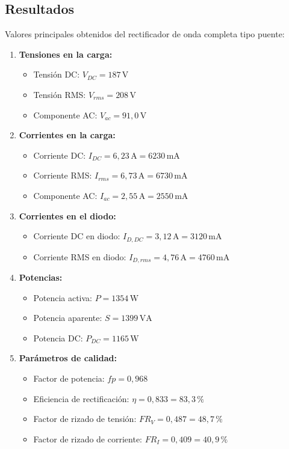 \documentclass[12pt,a4paper]{article}
\begin{document}
\subsection{Resultados}

Valores principales obtenidos del rectificador de onda completa tipo puente:

\begin{enumerate}
    \item \textbf{Tensiones en la carga:}
    \begin{itemize}
        \item Tensión DC: $V_{DC} = 187\,\text{V}$
        \item Tensión RMS: $V_{rms} = 208\,\text{V}$
        \item Componente AC: $V_{ac} = 91{,}0\,\text{V}$
    \end{itemize}

    \item \textbf{Corrientes en la carga:}
    \begin{itemize}
        \item Corriente DC: $I_{DC} = 6{,}23\,\text{A} = 6230\,\text{mA}$
        \item Corriente RMS: $I_{rms} = 6{,}73\,\text{A} = 6730\,\text{mA}$
        \item Componente AC: $I_{ac} = 2{,}55\,\text{A} = 2550\,\text{mA}$
    \end{itemize}

    \item \textbf{Corrientes en el diodo:}
    \begin{itemize}
        \item Corriente DC en diodo: $I_{D,DC} = 3{,}12\,\text{A} = 3120\,\text{mA}$
        \item Corriente RMS en diodo: $I_{D,rms} = 4{,}76\,\text{A} = 4760\,\text{mA}$
    \end{itemize}

    \item \textbf{Potencias:}
    \begin{itemize}
        \item Potencia activa: $P = 1354\,\text{W}$
        \item Potencia aparente: $S = 1399\,\text{VA}$
        \item Potencia DC: $P_{DC} = 1165\,\text{W}$
    \end{itemize}

    \item \textbf{Parámetros de calidad:}
    \begin{itemize}
        \item Factor de potencia: $fp = 0{,}968$
        \item Eficiencia de rectificación: $\eta = 0{,}833 = 83{,}3\,\%$
        \item Factor de rizado de tensión: $FR_V = 0{,}487 = 48{,}7\,\%$
        \item Factor de rizado de corriente: $FR_I = 0{,}409 = 40{,}9\,\%$
    \end{itemize}
\end{enumerate}
\end{document}
